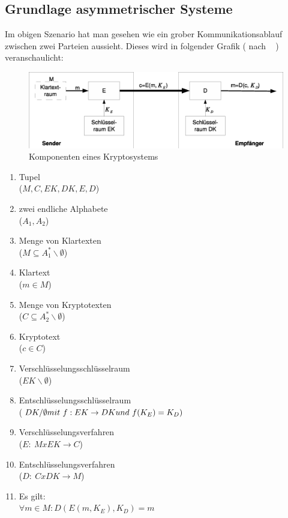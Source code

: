 \documentclass[paper=a4,11pt,german]{scrartcl} %
\begin{document}
\subsection{Grundlage asymmetrischer Systeme}
Im obigen Szenario hat man gesehen wie ein grober Kommunikationsablauf zwischen zwei Parteien aussieht. Dieses wird in folgender Grafik ( nach ~\cite{Eckert13} ) veranschaulicht:
\begin{figure}[htb]
	\centering
	\includegraphics[width=\textwidth]{async.eps}
	\caption{Komponenten eines Kryptosystems}
	\label{fig:sim}
\end{figure}
\begin{multicols}{2}
\begin{enumerate}
\item Tupel \\($M,C,EK,DK,E,D$)
\item zwei endliche Alphabete \\($A_1,A_2$)
\item Menge von Klartexten \\($M \subseteq A^*_1\backslash\emptyset$)
\item Klartext \\($m \in M$)
\item Menge von Kryptotexten \\($C \subseteq A^*_2\backslash\emptyset$)
\item Kryptotext \\($c \in C$)
\item Verschlüsselungsschlüsselraum \\($EK\backslash\emptyset$)
\item Entschlüsselungsschlüsselraum\\($DK/\emptyset \\mit~ f:EK \rightarrow DK \\und~ f(K_E)=K_D)$
\item Verschlüsselungsverfahren \\($E :~ M x EK \rightarrow C$)
\item Entschlüsselungsverfahren \\($D :~ C x DK \rightarrow M$)
\item Es gilt: \\ $\forall m \in M : D(E(m,K_E),K_D) = m$
\end{enumerate}
\end{multicols}
\end{document}
